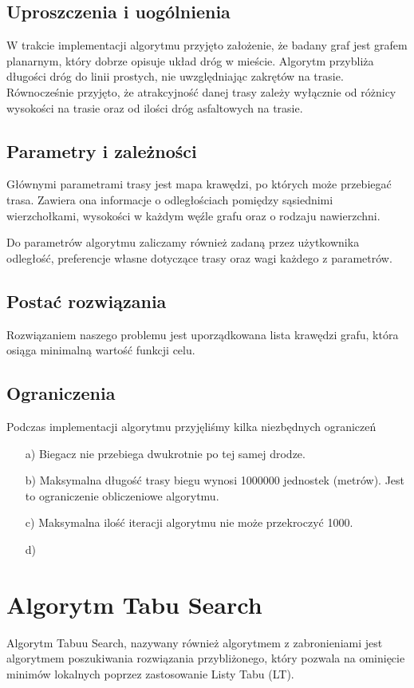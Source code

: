 \documentclass[12pt,a4paper]{article}
\begin{document}
\subsection{Uproszczenia i uogólnienia}
W trakcie implementacji algorytmu przyjęto założenie, że badany graf jest grafem planarnym, który dobrze opisuje układ dróg w mieście. Algorytm przybliża długości dróg do linii prostych, nie uwzględniając zakrętów na trasie.
Równocześnie przyjęto, że atrakcyjność danej trasy zależy wyłącznie od różnicy wysokości na trasie oraz od ilości dróg asfaltowych na trasie.

\subsection{Parametry i zależności}
Głównymi parametrami trasy jest mapa krawędzi, po których może przebiegać trasa. Zawiera ona informacje o odległościach pomiędzy sąsiednimi wierzchołkami, wysokości w każdym węźle grafu oraz o rodzaju nawierzchni.

Do parametrów algorytmu zaliczamy również zadaną przez użytkownika odległość, preferencje własne dotyczące trasy oraz wagi każdego z parametrów.

\subsection{Postać rozwiązania}
Rozwiązaniem naszego problemu jest uporządkowana lista krawędzi grafu, która osiąga minimalną wartość funkcji celu.


\subsection{Ograniczenia}
Podczas implementacji algorytmu przyjęliśmy kilka niezbędnych ograniczeń
\begin{enumerate}
\item[a)] Biegacz nie przebiega dwukrotnie po tej samej drodze.
\item[b)] Maksymalna długość trasy biegu wynosi 1000000 jednostek (metrów). Jest to ograniczenie obliczeniowe algorytmu.
\item[c)] Maksymalna ilość iteracji algorytmu nie może przekroczyć 1000.
\item[d)] 
\end{enumerate}


\section{Algorytm Tabu Search}
Algorytm Tabuu Search, nazywany również algorytmem z zabronieniami jest algorytmem poszukiwania rozwiązania przybliżonego, który pozwala na ominięcie minimów lokalnych poprzez zastosowanie Listy Tabu (LT).
\end{document}
